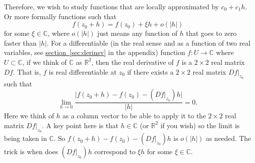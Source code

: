 \documentclass[12pt,openany]{book}
\newcommand{\sabs}[1]{\lvert {#1} \rvert}
\newcommand{\C}{{\mathbb{C}}}
\newcommand{\R}{{\mathbb{R}}}
\theoremstyle{plain}
\theoremstyle{remark}
\theoremstyle{definition}
\theoremstyle{exercise}
\theoremstyle{example}
\newcommand{\sectionref}[1]{\hyperref[#1]{section~\ref*{#1}}}
\begin{document}
Therefore, we wish to study functions that are
locally approximated by $c_0 + c_1 h$.  Or more formally functions
such that
\begin{equation*}
f(z_0+h) = f(z_0) + \xi h + o(\sabs{h})
\end{equation*}
for some $\xi \in \C$, where $o(\sabs{h})$ just means any function of $h$
that goes to zero faster than $\sabs{h}$.
For a differentiable (in the real sense
and as a function of two real variables,
see \sectionref{sec:derinsv} in the appendix) function $f \colon U \to
\C$ where $U \subset \C$, if we think of $\C$ as $\R^2$,
then the real derivative of $f$ is a $2 \times 2$ real matrix $D f$.
That is, $f$ is real differentiable at $z_0$ if there exists
a $2 \times 2$ real matrix $Df|_{z_0}$ such that
\begin{equation*}
\lim_{h \to 0} \frac{\sabs{f(z_0+h) - f(z_0) - (Df|_{z_0}) h}}{\sabs{h}} = 0 .
\end{equation*}
Here we think of $h$ as a column vector to be able to apply it to the
$2 \times 2$ real matrix $Df|_{z_0}$.
A key point here is that $h \in \C$ (or $\R^2$ if you wish)
so the limit is being taken in $\C$.
So $f(z_0+h) - f(z_0) - (Df|_{z_0}) h$ is $o(\sabs{h})$ as needed.
The trick is when does $(Df|_{z_0}) h$ correspond to $\xi h$ for some $\xi \in
\C$.
\end{document}
